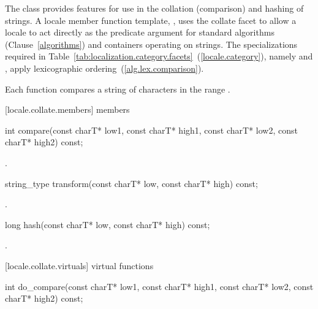 \pnum
The class
provides features for use in the
collation (comparison) and hashing of strings.
A locale member function template,
,
uses the collate facet to allow a locale to act directly as the predicate
argument for standard algorithms (Clause~\ref{algorithms}) and containers operating on strings.
The specializations required in Table~\ref{tab:localization.category.facets}~(\ref{locale.category}), namely
and
,
apply lexicographic ordering~(\ref{alg.lex.comparison}).

\pnum
Each function compares a string of characters
in the range
.

[locale.collate.members]{ members}

%
\begin{itemdecl}
int compare(const charT* low1, const charT* high1,
            const charT* low2, const charT* high2) const;
\end{itemdecl}

\begin{itemdescr}
\pnum
\returns
{}.
\end{itemdescr}

%
\begin{itemdecl}
string_type transform(const charT* low, const charT* high) const;
\end{itemdecl}

\begin{itemdescr}
\pnum
\returns
{}.
\end{itemdescr}

%
\begin{itemdecl}
long hash(const charT* low, const charT* high) const;
\end{itemdecl}

\begin{itemdescr}
\pnum
\returns
{}.
\end{itemdescr}

[locale.collate.virtuals]{ virtual functions}

%
\begin{itemdecl}
int do_compare(const charT* low1, const charT* high1,
               const charT* low2, const charT* high2) const;
\end{itemdecl}

